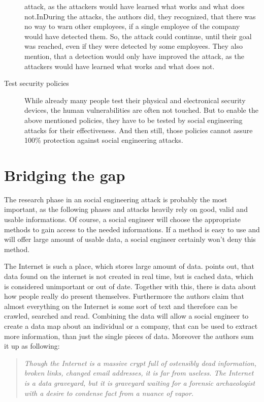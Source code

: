 \begin{description}
  attack, as the attackers would have learned what works and what does
  not.InDuring the attacks, the authors did, they recognized, that there was
  no way to warn other employees, if a single employee of the company would
  have detected them. So, the attack could continue, until their goal was
  reached, even if they were detected by some employees. They also mention,
  that a detection would only have improved the attack, as the attackers would
  have learned what works and what does not.
  \item[Test security policies] While already many people test their physical
  and electronical security devices, the human vulnerabilities are often not
  touched. But to enable the above mentioned policies, they have to be tested
  by social engineering attacks for their effectiveness. And then still, those
  policies cannot assure 100\% protection against social engineering attacks.
\end{description}

\section{Bridging the gap}

The research phase in an social engineering attack is probably the most
important, as the following phases and attacks heavily rely on good, valid and
usable informations. Of course, a social engineer will choose the appropriate
methods to gain access to the needed informations. If a method is easy to use
and will offer large amount of usable data, a social engineer certainly won't
deny this method.

The Internet is such a place, which stores large amount of data.
\cite{nolan2005} points out, that data found on the internet is not created in
real time, but is cached data, which is considered unimportant or out of date.
Together with this, there is data about how people really do present
themselves. Furthermore the authors claim that almost everything on the
Internet is some sort of text and therefore can be crawled, searched and read.
Combining the data will allow a social engineer to create a data map about an
individual or a company, that can be used to extract more information, than
just the single pieces of data. Moreover the authors sum it up as following:

\begin{quote}
\textit{Though the Internet is a massive crypt full of ostensibly dead
information, broken links, changed email addresses, it is far from useless. The
Internet is a data graveyard, but it is graveyard waiting for a forensic
archaeologist with a desire to \glqq{}condense fact from a nuance of
vapor\grqq{}.}
\end{quote}

